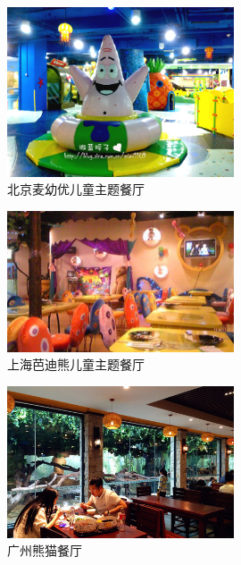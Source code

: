 \begin{figure}[htbp]
        \caption{北京麦幼优儿童主题餐厅}
        \centering
        \includegraphics[width=0.6\textwidth]{../images/competitors/北京麦幼优儿童主题餐厅}
\end{figure}

\begin{figure}[htbp]
        \caption{上海芭迪熊儿童主题餐厅}
        \centering
        \includegraphics[width=0.6\textwidth]{../images/competitors/上海芭迪熊儿童主题餐厅}
\end{figure}

\begin{figure}[htbp]
        \caption{广州熊猫餐厅}
        \centering
        \includegraphics[width=0.6\textwidth]{../images/competitors/广州熊猫餐厅}
\end{figure}

